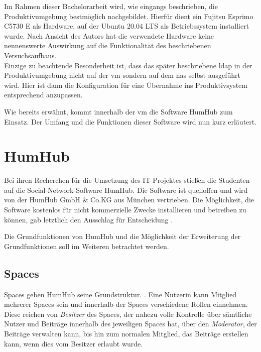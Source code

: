 Im Rahmen dieser Bachelorarbeit wird, wie eingangs beschrieben, die Produktivumgebung bestmöglich nachgebildet. Hierfür dient ein Fujitsu Esprimo C5730 E als Hardware, auf der Ubuntu 20.04 LTS als Betriebssystem installiert wurde. Nach Ansicht des Autors hat die verwendete Hardware keine nennenswerte Auswirkung auf die Funktionalität des beschriebenen Versuchsaufbaus. \\ Einzige zu beachtende Besonderheit ist, dass das später beschriebene \ac{ldap} in der Produktivumgebung nicht auf der \ac{vm} sondern auf dem \ac{nas} selbst ausgeführt wird. Hier ist dann die Konfiguration für eine Übernahme ins Produktivsystem entsprechend anzupassen.

Wie bereits erwähnt, kommt innerhalb der \ac{vm} die Software HumHub zum Einsatz. Der Umfang und die Funktionen dieser Software wird nun kurz erläutert.

\section{HumHub}

Bei ihren Recherchen für die Umsetzung des IT-Projektes stießen die Studenten auf die Social-Network-Software HumHub. Die Software ist quelloffen und wird von der HumHub GmbH \& Co.KG aus München vertrieben. Die Möglichkeit, die Software kostenlos für nicht kommerzielle Zwecke installieren und betreiben zu können, gab letztlich den Ausschlag für Entscheidung   \citep{humhubmain}.

Die Grundfunktionen von HumHub und die Möglichkeit der Erweiterung der Grundfunktionen soll im Weiteren betrachtet werden.

\subsection{Spaces}

Spaces geben HumHub seine Grundstruktur.  \citep{spaces}. 
Eine Nutzerin kann Mitglied mehrerer Spaces sein und innerhalb der Spaces verschiedene Rollen einnehmen. Diese reichen von \textit{Besitzer} des Spaces, der nahezu volle Kontrolle über sämtliche Nutzer und Beiträge innerhalb des jeweiligen Spaces hat, über den \textit{Moderator}, der Beiträge verwalten kann, bis hin zum normalen Mitglied, das Beiträge erstellen kann, wenn dies vom Besitzer erlaubt wurde.  

